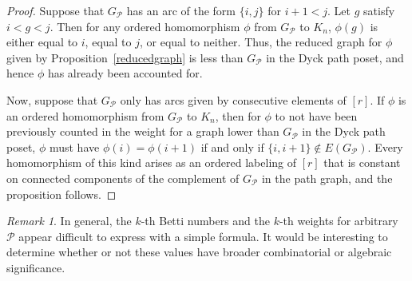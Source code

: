 \documentclass[11pt]{amsart}
\theoremstyle{definition}
\numberwithin{equation}{section}
\theoremstyle{remark}
\newtheorem{remark}[theorem]{Remark}
\numberwithin{equation}{section}
\begin{document}
\begin{proof}
Suppose that $G_{\mathcal{P}}$ has an arc of the form $\{i,j\}$ for $i+1<j$.  
Let $g$ satisfy $i<g<j$.
Then for any ordered homomorphism $\phi$ from $G_{\mathcal{P}}$ to $K_n$, $\phi(g)$ is either equal to $i$, equal to $j$, or equal to neither.
Thus, the reduced graph for $\phi$ given by Proposition~\ref{reducedgraph} is less than $G_{\mathcal{P}}$ in the Dyck path poset, and hence $\phi$ has already been accounted for.

Now, suppose that $G_{\mathcal{P}}$ only has arcs given by consecutive elements of $[r]$.
If $\phi$ is an ordered homomorphism from $G_{\mathcal{P}}$ to $K_n$, then for $\phi$ to not have been previously counted in the weight for a graph lower than $G_{\mathcal{P}}$ in the Dyck path poset, $\phi$ must have $\phi(i)=\phi(i+1)$ if and only if $\{i,i+1\}\notin E(G_{\mathcal{P}})$.
Every homomorphism of this kind arises as an ordered labeling of $[r]$ that is constant on connected components of the complement of $G_{\mathcal{P}}$ in the path graph, and the proposition follows.
\end{proof}

\begin{remark}
In general, the $k$-th Betti numbers and the $k$-th weights for arbitrary ${\mathcal{P}}$ appear difficult to express with a simple formula.
It would be interesting to determine whether or not these values have broader combinatorial or algebraic significance.
\end{remark}



\end{document}
